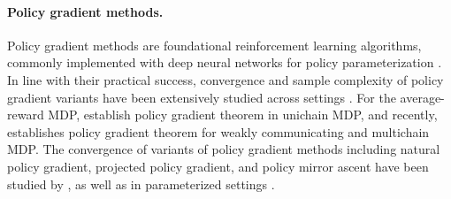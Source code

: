 \documentclass{article}
\theoremstyle{definition}
\theoremstyle{remark}
\begin{document}
\paragraph{Policy gradient methods.}
Policy gradient methods \citep{williams1992simple,sutton1999,konda1999actor,kakade2001natural} are foundational reinforcement learning algorithms, commonly implemented with deep neural networks for policy parameterization \citep{schulman2015trust,schulman2017proximal}. In line with their practical success, convergence and sample complexity of policy gradient variants have been extensively studied across settings \citep{shani2020adaptive, mei2020global, agarwal2021theory, cen2022fast, xiao2022convergence, bhandari2024global,mondal2024improved}. For the average-reward MDP, \cite{sutton1999, marbach2001simulation, baxter2000direct} establish policy gradient theorem in unichain MDP, and recently, \cite{lee2025multi} establishes policy gradient theorem for weakly communicating and multichain MDP. The convergence of variants of policy gradient methods including natural policy gradient, projected policy gradient, and policy mirror ascent have been studied by  \cite{murthy2023convergence,kumar2024global,lee2025multi}, as well as in parameterized settings \cite{bai2024regret, patel2024towards, ganesh2024order, ganeshsharper, ganesh2025regret}.



\end{document}
